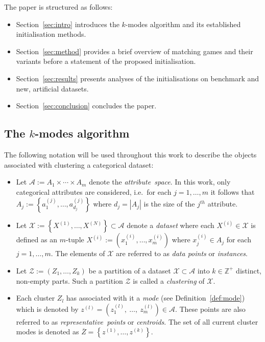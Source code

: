 \documentclass[smallextended]{svjour3}
\begin{document}
The paper is structured as follows:
\begin{itemize}
    \item Section~\ref{sec:intro} introduces the \(k\)-modes algorithm and its
        established initialisation methods.
    \item Section~\ref{sec:method} provides a brief overview of
        matching games and their variants before a statement of the proposed
        initialisation.
    \item Section~\ref{sec:results} presents analyses of the initialisations
        on benchmark and new, artificial datasets.
    \item Section~\ref{sec:conclusion} concludes the paper.
\end{itemize}


\subsection{The \(k\)-modes algorithm}\label{subsec:kmodes}

The following notation will be used throughout this work to describe the objects
associated with clustering a categorical dataset:

\begin{itemize}
    \item Let \(\mathcal{A} := A_1 \times \cdots \times A_m\) denote the
        \emph{attribute~space}. In this work, only categorical attributes are
        considered, i.e.\ for each \(j = 1, \ldots, m\) it follows that \(A_j :=
        \left\{a_1^{(j)}, \ldots, a_{d_j}^{(j)}\right\}\) where \(d_j = |A_j|\)
        is the size of the \(j^{th}\) attribute.

    \item Let \(\mathcal{X} := \left\{X^{(1)}, \ldots, X^{(N)}\right\} \subset
        \mathcal{A}\) denote a \emph{dataset} where each \(X^{(i)} \in
        \mathcal{X}\) is defined as an \(m\)-tuple \(X^{(i)} := \left(x_1^{(i)},
        \ldots, x_m^{(i)}\right)\) where \(x_j^{(i)} \in A_j\) for each \(j = 1,
        \ldots, m\). The elements of \(\mathcal{X}\) are referred to as
        \emph{data points} or \emph{instances}.
    \item Let \(\mathcal{Z} := \left(Z_1, \ldots, Z_k\right)\) be a partition
        of a dataset \(\mathcal{X} \subset \mathcal A\) into \(k \in
        \mathbb{Z}^{+}\) distinct, non-empty parts. Such a partition
        \(\mathcal{Z}\) is called a \emph{clustering} of \(\mathcal{X}\).

    \item Each cluster \(Z_l\) has associated with it a
        \emph{mode} (see Definition~\ref{def:mode}) which is
        denoted by \(z^{(l)} = \left(z_1^{(l)},~\ldots,~z_m^{(l)}\right) \in
        \mathcal{A}\).  These points are also referred to as
        \emph{representative~points} or \emph{centroids}. The set of all current
        cluster modes is denoted as \(\overline Z = \left\{z^{(1)}, \ldots,
        z^{(k)}\right\}\).
\end{itemize}
\end{document}
